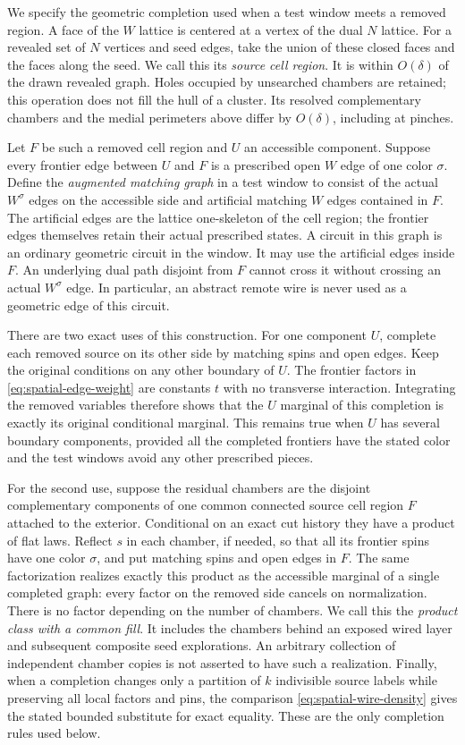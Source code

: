 We specify the geometric completion used when a test window meets a
removed region. A face of the $W$ lattice is centered at a vertex of
the dual $N$ lattice. For a revealed set of $N$ vertices and seed edges,
take the union of these closed faces and the faces along the seed. We
call this its \emph{source cell region}. It is within $O(\delta)$
of the drawn revealed graph. Holes occupied by unsearched chambers are
retained; this operation does not fill the hull of a cluster. Its
resolved complementary chambers and the medial perimeters above differ
by $O(\delta)$, including at pinches.

Let $F$ be such a removed cell region and $U$ an accessible component.
Suppose every frontier edge between $U$ and $F$ is a prescribed open
$W$ edge of one color $\sigma$. Define the \emph{augmented matching
graph} in a test window to consist of the actual $W^\sigma$ edges on the
accessible side and artificial matching $W$ edges contained in $F$.
The artificial edges are the lattice one-skeleton of the cell region;
the frontier edges themselves retain their actual prescribed states.
A circuit in this graph is an ordinary geometric circuit in the
window. It may use the artificial edges inside $F$. An underlying dual
path disjoint from $F$ cannot cross it without crossing an actual
$W^\sigma$ edge. In particular, an abstract remote wire is never used
as a geometric edge of this circuit.

There are two exact uses of this construction. For one component $U$,
complete each removed source on its other side by matching spins and
open edges. Keep the original conditions on any other boundary of $U$.
The frontier factors in \eqref{eq:spatial-edge-weight} are constants
$t$ with no transverse interaction. Integrating the removed variables
therefore shows that the $U$ marginal of this completion is exactly its
original conditional marginal. This remains true when $U$ has several
boundary components, provided all the completed frontiers have the
stated color and the test windows avoid any other prescribed pieces.

For the second use, suppose the residual chambers are the disjoint
complementary components of one common connected source cell region
$F$ attached to the exterior. Conditional on an exact cut history they
have a product of flat laws. Reflect $s$ in each chamber, if needed, so
that all its frontier spins have one color $\sigma$, and put matching
spins and open edges in $F$. The same factorization realizes exactly
this product as the accessible marginal of a single completed graph:
every factor on the removed side cancels on normalization. There is no
factor
depending on the number of chambers. We call this the
\emph{product class with a common fill}. It includes the chambers behind
an exposed wired layer
and subsequent composite seed explorations. An arbitrary collection of
independent chamber copies is not asserted to have such a realization.
Finally, when a completion changes only a partition of $k$ indivisible
source labels while preserving all local factors and pins, the comparison
\eqref{eq:spatial-wire-density} gives the stated bounded substitute for
exact equality. These are the only completion rules used below.

